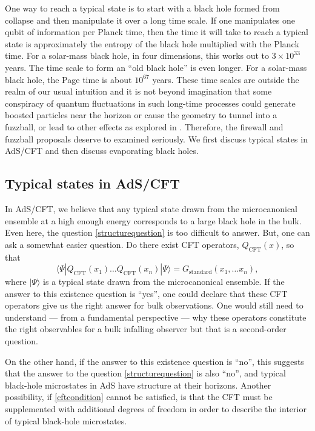 \documentclass[12pt]{article}
\def\qop{Q}
\newcommand{\be}{\begin{equation}}
\newcommand{\ee}{\end{equation}}
\begin{document}
One way to reach a typical state is to start with a black hole formed from collapse and then manipulate it over a long time scale. If one manipulates one qubit of information per Planck time,  then the time it will take to reach a typical state is approximately the entropy of the black hole multiplied with the Planck time. For a solar-mass black hole, in four dimensions, this works out to $3 \times 10^{33}$ years. The time scale to form an ``old black hole'' is even longer. For a solar-mass black hole, the Page time is about $10^{67}$ years. These time scales are outside the realm of our usual intuition and it is not beyond imagination that some conspiracy of quantum fluctuations in such long-time processes could generate boosted particles near the horizon or cause the geometry to tunnel into a fuzzball, or lead to other effects as explored in \cite{Hutchinson:2013kka}. Therefore, the firewall and fuzzball proposals deserve to examined seriously. We first discuss typical states in AdS/CFT and then discuss evaporating black holes.



\subsection{Typical states in AdS/CFT \label{typicalads}}

In AdS/CFT, we believe that any typical state drawn from the microcanonical ensemble at a high enough energy corresponds to a large black hole in the bulk. Even here, the question \eqref{structurequestion} is too difficult to answer. But, one can ask a somewhat easier question. Do there exist CFT operators, $\qop_{\text{CFT}}(x)$, so that 
\be
\label{cftcondition}
\langle \Psi |  \qop_{\text{CFT}}(x_1) \ldots \qop_{\text{CFT}}(x_n) |\Psi \rangle = G_{\text{standard}}(x_1, \ldots x_n),
\ee
where $|\Psi \rangle$ is a typical state drawn from the microcanonical ensemble.
If the answer to this existence question is ``yes'', one could declare that these CFT operators give us the right answer for bulk observations. One would still need to understand --- from a fundamental perspective --- why these operators constitute the right observables for a bulk infalling observer but that is a second-order question. 

On the other hand, if the answer to this existence question is ``no'', this suggests that the answer to the question \eqref{structurequestion} is also ``no'', and typical black-hole microstates in AdS have structure at their horizons. Another possibility, if \eqref{cftcondition} cannot be satisfied, is  that the CFT must be supplemented with additional degrees of freedom in order to describe the interior of typical black-hole microstates.
\end{document}
